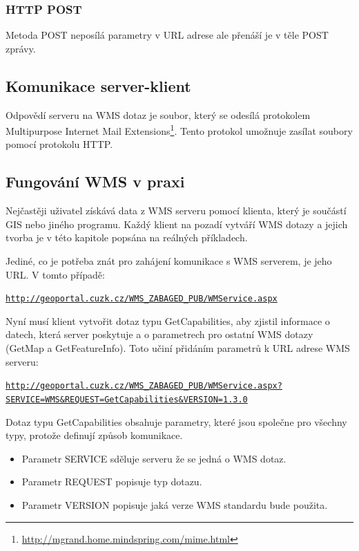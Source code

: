 \documentclass[a4paper,12pt]{article}
\begin{document}
\subsubsection{HTTP POST}

Metoda POST neposílá parametry v URL adrese ale přenáší je v těle POST zprávy.


\subsection{Komunikace server-klient}

Odpovědí serveru na WMS dotaz je soubor, který se odesílá protokolem Multipurpose Internet Mail Extensions\footnote{\url{http://mgrand.home.mindspring.com/mime.html}}. Tento protokol umožnuje zasílat soubory pomocí protokolu HTTP.


\subsection{Fungování WMS v praxi}

 
Nejčastěji uživatel získává data z WMS serveru pomocí klienta, který je součástí GIS nebo jiného programu. Každý klient na pozadí vytváří WMS dotazy a jejich 
tvorba je v této kapitole popsána na reálných příkladech. 


\newpage
Jediné, co je potřeba znát pro zahájení komunikace s WMS serverem, je jeho URL. V tomto případě:
\begin{alltt}\footnotesize
\url{http://geoportal.cuzk.cz/WMS_ZABAGED_PUB/WMService.aspx}
\end{alltt}

Nyní musí klient vytvořit dotaz typu GetCapabilities, aby zjistil informace o datech, která server poskytuje a o parametrech pro ostatní WMS dotazy (GetMap a GetFeatureInfo).
Toto učiní přidáním parametrů k URL adrese WMS serveru:

\newcommand{\CUZKgetCap}{http://geoportal.cuzk.cz/WMS_ZABAGED_PUB/WMService.aspx?SERVICE=WMS&REQUEST=GetCapabilities&VERSION=1.3.0}
\begin{alltt}\footnotesize
\href{\CUZKgetCap}{http://geoportal.cuzk.cz/WMS_ZABAGED_PUB/WMService.aspx?}
\href{\CUZKgetCap}{SERVICE=WMS&REQUEST=GetCapabilities&VERSION=1.3.0}
\end{alltt}

 Dotaz typu GetCapabilities obsahuje parametry, které jsou společne pro všechny typy, protože definují způsob komunikace.
\begin{itemize}
  \item Parametr SERVICE sděluje serveru že se jedná o WMS dotaz. 
  \item Parametr REQUEST popisuje typ dotazu. 
  \item Parametr VERSION popisuje jaká verze WMS standardu bude použita.
\end{itemize}
\end{document}
